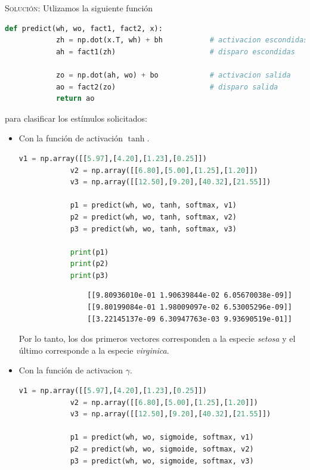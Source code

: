 \documentclass[letterpaper,11pt]{article}
\begin{document}
\begin{enumerate}
\begin{enumerate}
        \textsc{Solución:} Utlizamos la siguiente función 
        \begin{lstlisting}[language=Python]
        def predict(wh, wo, fact1, fact2, x):
            zh = np.dot(x.T, wh) + bh           # activacion escondidas
            ah = fact1(zh)                      # disparo escondidas
            
            zo = np.dot(ah, wo) + bo            # activacion salida 
            ao = fact2(zo)                      # disparo salida
            return ao
        \end{lstlisting}

        para clasificar los estímulos solicitados:
        \begin{itemize}
            \item Con la función de activación $\tanh$.
            \begin{lstlisting}[language=Python]
            v1 = np.array([[5.97],[4.20],[1.23],[0.25]])
            v2 = np.array([[6.80],[5.00],[1.25],[1.20]])
            v3 = np.array([[12.50],[9.20],[40.32],[21.55]])

            p1 = predict(wh, wo, tanh, softmax, v1)
            p2 = predict(wh, wo, tanh, softmax, v2)
            p3 = predict(wh, wo, tanh, softmax, v3)

            print(p1)
            print(p2)
            print(p3)
            \end{lstlisting}

            \begin{verbatim}
                [[9.80936010e-01 1.90639844e-02 6.05670038e-09]]
                [[9.80199084e-01 1.98009097e-02 6.53005296e-09]]
                [[3.22145137e-09 6.30947763e-03 9.93690519e-01]]
            \end{verbatim}

            Por lo tanto, los dos primeros vectores corresponden a la especie 
            \textit{setosa} y el último corresponde a la especie 
            \textit{virginica}.

            \item Con la función de activacion $\gamma$.
            \begin{lstlisting}[language=Python]
            v1 = np.array([[5.97],[4.20],[1.23],[0.25]])
            v2 = np.array([[6.80],[5.00],[1.25],[1.20]])
            v3 = np.array([[12.50],[9.20],[40.32],[21.55]])

            p1 = predict(wh, wo, sigmoide, softmax, v1)
            p2 = predict(wh, wo, sigmoide, softmax, v2)
            p3 = predict(wh, wo, sigmoide, softmax, v3)


\end{lstlisting}
\end{itemize}
\end{enumerate}
\end{enumerate}
\end{document}
